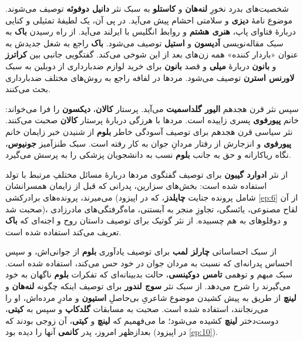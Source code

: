 \documentclass[12pt]{book}
\newcommand{\noun}[1]{{\textbf{#1}}}
\begin{document}
    شخصیت‌های بدرد نخورِ \noun{لنه‌هان} و \noun{کاستلو} به سبک نثر \noun{دانیل دوفوئه} توصیف می‌شوند. موضوع نامهٔ \noun{دیزی} و سلامتی احشام پیش می‌آید. در پی آن، یک لطیفهٔ تمثیلی و کنایی دربارهٔ فتاوای پاپ، \noun{هنری هشتم} و روابط انگلیس با ایرلند می‌آید. از راه رسیدن \noun{باک}  به سبک مقاله‌نویسی \noun{اَدیسون} و \noun{استیل} توصیف می‌شود. \noun{باک}  راجع به شغل جدیدش به عنوان «باردار کننده» همه زن‌های بعد از این شوخی می‌کند. گفتگویی جانبی بین \noun{کراترز} و \noun{بانون} دربارهٔ \noun{میلی} و قصد \noun{بانون} برای خرید لوازم ضدبارداری از دوبلین به سبک \noun{لاورنس استرن} توصیف می‌شود. مردها در لفافه راجع به روش‌های مختلف ضدبارداری بحث می‌کنند.

    سپس نثر قرن هجدهم \noun{الیور گلداسمیت} می‌آید. پرستار \noun{کالان}، \noun{دیکسون} را فرا می‌خواند: خانم \noun{پیورفوی} پسری زاییده است. مردها با هرزگی دربارهٔ پرستار \noun{کالان} صحبت می‌کنند. نثر سیاسی قرن هجدهم برای توصیف آسودگی خاطر \noun{بلوم} از شنیدن خبر زایمان خانم \noun{پیورفوی} و انزجارش از رفتار مردانِ جوان به کار رفته است. سبک طنزآمیز \noun{جونیوس}، نگاه ریاکارانه و حق به جانب \noun{بلوم} نسب به دانشجویان پزشکی را به پرسش می‌گیرد.

    از نثر \noun{ادوارد گیبون} برای توصیف گفتگوی مردها دربارهٔ مسائل مختلفِ مرتبط با تولد استفاده شده است: بخش‌های سزارین، پدرانی که قبل از زایمان همسرانشان می‌میرند، پرونده‌های برادرکشی (شامل پرونده جنایت \noun{چایلدز}، که در اپیزود \ref{ep:6} از آن صحبت شد)، لقاح مصنوعی، یائسگی، تجاوزِ منجر به آبستنی، ماه‌گرفتگی‌های مادرزادی و دوقلوهای به هم چسبیده. از نثر گوتیک برای توصیف داستان روح و اجنه‌ای که \noun{باک}  تعریف می‌کند استفاده شده است.

    از سبک احساساتی \noun{چارلز لمب} برای توصیف یادآوری \noun{بلوم} از جوانی‌اش، و سپس احساس پدرانه‌ای که نسبت به مردان جوان در خود حس می‌کند، استفاده شده است. سبک مبهم و توهمی \noun{تامس دوکینسی}، حالت بدبینانه‌ای که تفکرات \noun{بلوم} ناگهان به خود می‌گیرند را شرح می‌دهد. از سبک نثر \noun{سوج لندور} برای توصیف اینکه چگونه \noun{لنه‌هان} و \noun{لینچ} از طریق به پیش کشیدن موضوع شاعریِ بی‌حاصلِ \noun{استیون} و مادرِ مرده‌اش، او را می‌رنجانند، استفاده شده است. صحبت به مسابقات \noun{گلدکاپ} و سپس به \noun{کیتی}، دوست‌دختر \noun{لینچ} کشیده می‌شود؛ ما می‌فهمیم که \noun{لینچ} و \noun{کیتی}، آن زوجی بودند که بعدازظهر امروز، پدر \noun{کانمی} آنها را دیده بود (در اپیزود \ref{ep:10}).
\end{document}
